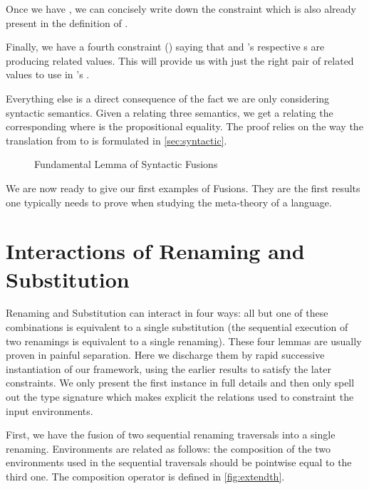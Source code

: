 Once we have , we can concisely write down the constraint  which
is also already present in the definition of .


Finally, we have a fourth constraint () saying that  and
's respective s are producing related values. This will provide
us with just the right pair of related values to use in 's .


Everything else is a direct consequence of the fact we are only considering
syntactic semantics. Given a  relating three 
semantics, we get a  relating the corresponding  where
 is the propositional equality. The proof relies on the way the
translation from  to  is formulated in
\cref{sec:syntactic}.

\begin{figure}
\caption{Fundamental Lemma of Syntactic Fusions\label{fig:fundamentalsynfus}}
\end{figure}

We are now ready to give our first examples of Fusions. They are the first results one
typically needs to prove when studying the meta-theory of a language.

\section{Interactions of Renaming and Substitution}

Renaming and Substitution can interact in four ways: all but one of these
combinations is equivalent to a single substitution (the sequential execution
of two renamings is equivalent to a single renaming). These four lemmas are
usually proven in painful separation. Here we discharge them by rapid successive
instantiation of our framework, using the earlier results to satisfy the later
constraints. We only present the first instance in full details and then only
spell out the  type signature which makes explicit the relations
used to constraint the input environments.

First, we have the fusion of two sequential renaming traversals into a single
renaming. Environments are related as follows: the composition of the two
environments used in the sequential traversals should be pointwise equal to
the third one. The composition operator  is defined in \cref{fig:extendth}.

